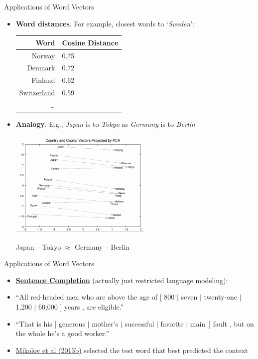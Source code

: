 \documentclass[xcolor=pdftex,x11names,table,hyperref]{beamer}
\begin{document}
\begin{frame}{Applications of Word Vectors}
\begin{itemize}
	\item \textbf{Word distances}.  For example, closest words to `\textit{Sweden}':
		\begin{center}
		\begin{footnotesize}
		\begin{tabular}{rl}
			\bf Word & \bf Cosine Distance \\
			\hline
			Norway & 0.75 \\
			Denmark & 0.72 \\
			Finland & 0.62 \\
			Switzerland & 0.59 \\
			\ldots & \\
		\end{tabular}
		\end{footnotesize}
		\end{center}
		\pause
	\item \textbf{Analogy}.  E.g., \textit{Japan} is to \textit{Tokyo} as \textit{Germany} is to \textit{Berlin}
		\begin{center}
		\includegraphics[width=0.54\textwidth]{images/countries_capitals.png}
		\end{center}
		\pause
		{\scriptsize Japan -- Tokyo $\approx$ Germany -- Berlin }
\end{itemize}
\end{frame}


\begin{frame}{Applications of Word Vectors}
\begin{itemize}
	\item \textbf{\href{http://research.microsoft.com/en-us/um/people/cburges/tech_reports/msr-tr-2011-129.pdf}{Sentence Completion}} (actually just restricted language modeling):
	\item ``All red-headed men who are above the age of {\color{darkblue} [ 800 $|$ seven $|$ twenty-one $|$ 1,200 $|$ 60,000 ]} years , are eligible.''
	\item ``That is his {\color{darkblue} [ generous $|$ mother's $|$ successful $|$ favorite $|$ main~]} fault , but on the whole he's a good worker.''
	\pause
	\item \href{http://arxiv.org/pdf/1301.3781.pdf}{Mikolov et al (2013b)} selected the test word that best predicted the context
\end{itemize}
\end{frame}
\end{document}

